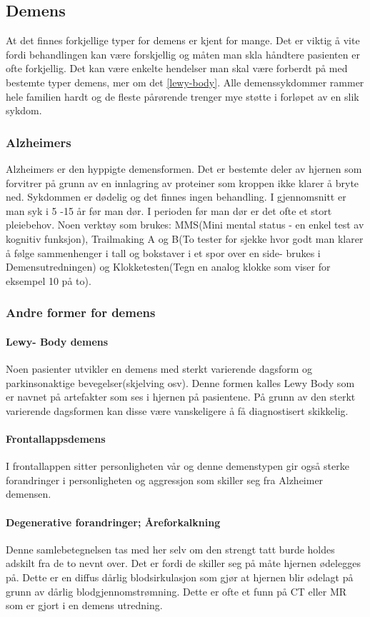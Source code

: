 			\subsection{Demens}
				At det finnes forkjellige typer for demens er kjent for mange. Det er viktig å vite fordi behandlingen kan være forskjellig og måten man skla håndtere pasienten er ofte forkjellig. Det kan være enkelte hendelser man skal være forberdt på med bestemte typer demens, mer om det \ref{lewy-body}. Alle demenssykdommer rammer hele familien hardt og de fleste pårørende trenger mye støtte i forløpet av en slik sykdom.
				\subsubsection{Alzheimers}
					Alzheimers er den hyppigte demensformen. Det er bestemte deler av hjernen som forvitrer på grunn av en innlagring av proteiner som kroppen ikke klarer å bryte ned. Sykdommen er dødelig og det finnes ingen behandling. I gjennomsnitt er man syk i 5 -15 år før man dør. I perioden før man dør er det ofte et stort pleiebehov. Noen verktøy som brukes: MMS(Mini mental status - en enkel test av kognitiv funksjon), Trailmaking A og B(To tester for sjekke hvor godt man klarer å følge sammenhenger i tall og bokstaver i et spor over en side- brukes i Demensutredningen) og Klokketesten(Tegn en analog klokke som viser for eksempel 10 på to). 
				\subsubsection{Andre former for demens}
					\paragraph{Lewy- Body demens\\}
						Noen pasienter utvikler en demens med sterkt varierende dagsform og parkinsonaktige bevegelser(skjelving osv). Denne formen kalles Lewy Body som er navnet på artefakter som ses i hjernen på pasientene. På grunn av den sterkt varierende dagsformen kan disse være vanskeligere å få diagnostisert skikkelig.
					\paragraph{Frontallappsdemens\\}
						I frontallappen sitter personligheten vår og denne demenstypen gir også sterke forandringer i personligheten og aggressjon som skiller seg fra Alzheimer demensen.
					\paragraph{Degenerative forandringer; Åreforkalkning\\}
						Denne samlebetegnelsen tas med her selv om den strengt tatt burde holdes adskilt fra de to nevnt over. Det er fordi de skiller seg på måte hjernen ødelegges på. Dette er en diffus dårlig blodsirkulasjon som gjør at hjernen blir ødelagt på grunn av dårlig blodgjennomstrømning. Dette er ofte et funn på CT eller MR som er gjort i en demens utredning.
